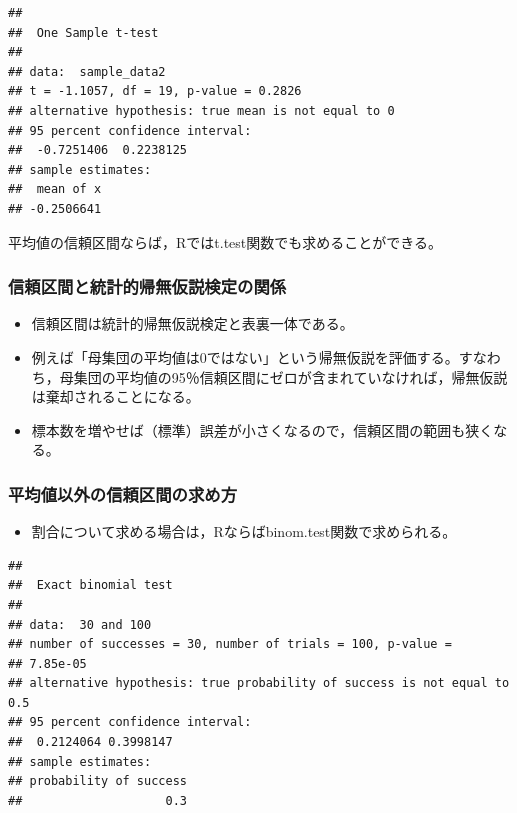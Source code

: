 \documentclass[]{article}
\newenvironment{Shaded}{\begin{snugshade}}{\end{snugshade}}
\newcommand{\KeywordTok}[1]{\textcolor[rgb]{0.13,0.29,0.53}{\textbf{#1}}}
\newcommand{\DataTypeTok}[1]{\textcolor[rgb]{0.13,0.29,0.53}{#1}}
\newcommand{\DecValTok}[1]{\textcolor[rgb]{0.00,0.00,0.81}{#1}}
\newcommand{\FloatTok}[1]{\textcolor[rgb]{0.00,0.00,0.81}{#1}}
\newcommand{\CommentTok}[1]{\textcolor[rgb]{0.56,0.35,0.01}{\textit{#1}}}
\newcommand{\NormalTok}[1]{#1}
\providecommand{\tightlist}{%
  \setlength{\itemsep}{0pt}\setlength{\parskip}{0pt}}
\begin{document}
\begin{verbatim}
## 
##  One Sample t-test
## 
## data:  sample_data2
## t = -1.1057, df = 19, p-value = 0.2826
## alternative hypothesis: true mean is not equal to 0
## 95 percent confidence interval:
##  -0.7251406  0.2238125
## sample estimates:
##  mean of x 
## -0.2506641
\end{verbatim}

平均値の信頼区間ならば，Rではt.test関数でも求めることができる。

\subsubsection{信頼区間と統計的帰無仮説検定の関係}

\begin{itemize}
\tightlist
\item
  信頼区間は統計的帰無仮説検定と表裏一体である。\\
\item
  例えば「母集団の平均値は0ではない」という帰無仮説を評価する。すなわち，母集団の平均値の95％信頼区間にゼロが含まれていなければ，帰無仮説は棄却されることになる。\\
\item
  標本数を増やせば（標準）誤差が小さくなるので，信頼区間の範囲も狭くなる。
\end{itemize}

\subsubsection{平均値以外の信頼区間の求め方}

\begin{itemize}
\tightlist
\item
  割合について求める場合は，Rならばbinom.test関数で求められる。
\end{itemize}

\begin{Shaded}
\end{Shaded}

\begin{verbatim}
## 
##  Exact binomial test
## 
## data:  30 and 100
## number of successes = 30, number of trials = 100, p-value =
## 7.85e-05
## alternative hypothesis: true probability of success is not equal to 0.5
## 95 percent confidence interval:
##  0.2124064 0.3998147
## sample estimates:
## probability of success 
##                    0.3
\end{verbatim}
\end{document}

